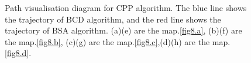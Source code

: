 \documentclass[conference]{IEEEtran}
\begin{document}
\begin{figure}[ht]
{\label{fig7e}
}\hspace{-16mm}
\quad
{}\hspace{-16mm}
\quad
{}\hspace{-16mm}
\quad
{}
\label{fig7h}
\caption{Path visualisation diagram for CPP algorithm. The blue line shows the trajectory of BCD algorithm, and the red line shows the trajectory of BSA algorithm. (a)(e) are the map.\ref{fig8.a}, (b)(f) are the map.\ref{fig8.b}, (c)(g) are the map.\ref{fig8.c},(d)(h) are the map.\ref{fig8.d}.}
\label{fig7}
\end{figure}
\end{document}
